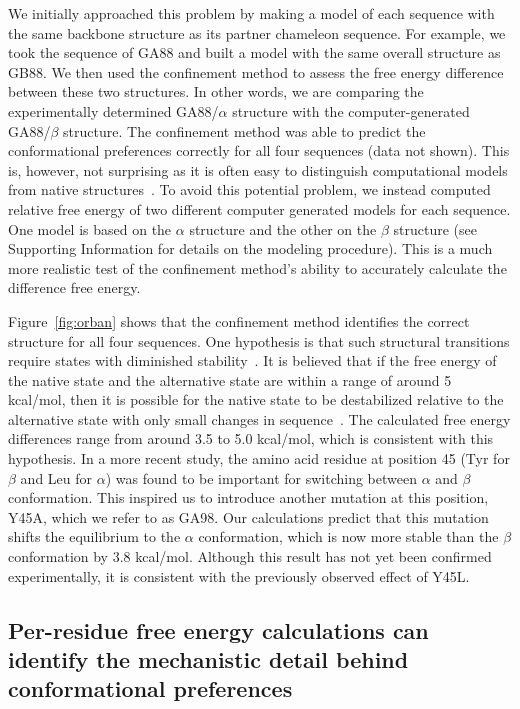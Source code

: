 \documentclass[12pt]{article}
\begin{document}
We initially approached this problem by making a model of each sequence with the same backbone structure as its partner
chameleon sequence. For example, we took the sequence of GA88 and built a model with the same overall structure as GB88.
We then used the confinement method to assess the free energy difference between these two structures. In other words,
we are comparing the experimentally determined GA88/$\alpha$ structure with the computer-generated GA88/$\beta$
structure. The confinement method was able to predict the conformational preferences correctly for all four sequences
(data not shown). This is, however, not surprising as it is often easy to distinguish computational models from native
structures~\cite{Handl2009,Sheffler2009}. To avoid this potential problem, we instead computed relative free energy of
two different computer generated models for each sequence. One model is based on the $\alpha$ structure and the other on
the $\beta$ structure (see Supporting Information for details on the modeling procedure). This is a much more realistic
test of the confinement method's ability to accurately calculate the difference free energy.

Figure~\ref{fig:orban} shows that the confinement method identifies the correct structure for all four sequences. One
hypothesis is that such structural transitions require states with diminished stability~\cite{Bryan2010}. It is believed
that if the free energy of the native state and the alternative state are within a range of around 5 kcal/mol, then it
is possible for the native state to be destabilized relative to the alternative state with only small changes in
sequence~\cite{He2008,Alexander2009,Bryan2010}. The calculated free energy differences range from around 3.5 to 5.0
kcal/mol, which is consistent with this hypothesis. In a more recent study\cite{He2012}, the amino acid residue at
position 45 (Tyr for $\beta$ and Leu for $\alpha$) was found to be important for switching between $\alpha$ and $\beta$
conformation. This inspired us to introduce another mutation at this position, Y45A, which we refer to as GA98. Our
calculations predict that this mutation shifts the equilibrium to the $\alpha$ conformation, which is now more stable
than the $\beta$ conformation by 3.8 kcal/mol. Although this result has not yet been confirmed experimentally, it is
consistent with the previously observed effect of Y45L.

\subsection*{Per-residue free energy calculations can identify the mechanistic detail behind conformational preferences}
\end{document}
